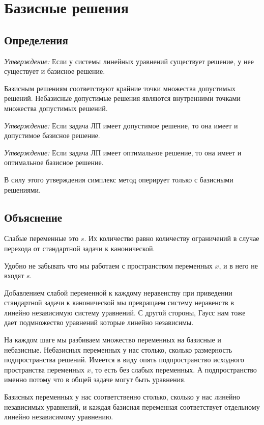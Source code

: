 \documentclass[a4paper,article,14pt]{extarticle}
\begin{document}
\newpage

\section{Базисные решения}

\subsection{Определения}

\textit{Утверждение:} Если у системы линейных уравнений существует решение, у нее существует и базисное решение.

Базисным решениям соответствуют крайние точки множества допустимых решений.
Небазисные допустимые решения являются внутренними точками множества допустимых решений.

\textit{Утверждение:} Если задача ЛП имеет допустимое решение, то она имеет и допустимое базисное решение.

\textit{Утверждение:} Если задача ЛП имеет оптимальное решение, то она имеет и оптимальное базисное решение.

В силу этого утверждения симплекс метод оперирует только с базисными решениями.

\subsection{Объяснение}

Слабые переменные это \(s\).
Их количество равно количеству ограничений в случае перехода от стандартной задачи к канонической.

Удобно не забывать что мы работаем с пространством переменных \(x\), и в него не входят \(s\).

Добавлением слабой переменной к каждому неравенству при приведении стандартной задачи к канонической мы превращаем систему неравенств в линейно независимую систему уравнений.
С другой стороны, Гаусс нам тоже дает подмножество уравнений которые линейно независимы.

На каждом шаге мы разбиваем множество переменных на базисные и небазисные.
Небазисных переменных у нас столько, сколько размерность подпространства решений.
Имеется в виду опять подпространство исходного пространства переменных \(x\), то есть без слабых переменных.
А подпространство именно потому что в общей задаче могут быть уравнения.

Базисных переменных у нас соответственно столько, сколько у нас линейно независимых уравнений, и каждая базисная переменная соответствует отдельному линейно независимому уравнению.
\end{document}
